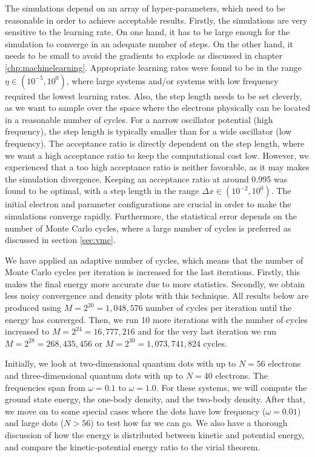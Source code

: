 The simulations depend on an array of hyper-parameters, which need to be reasonable in order to achieve acceptable results. Firstly, the simulations are very sensitive to the learning rate. On one hand, it has to be large enough for the simulation to converge in an adequate number of steps. On the other hand, it needs to be small to avoid the gradients to explode as discussed in chapter \ref{chp:machinelearning}. Appropriate learning rates were found to be in the range $\eta\in(10^{-5}, 10^{0})$, where large systems and/or systems with low frequency required the lowest learning rates. Also, the step length needs to be set cleverly, as we want to sample over the space where the electrons physically can be located in a reasonable number of cycles. For a narrow oscillator potential (high frequency), the step length is typically smaller than for a wide oscillator (low frequency). The acceptance ratio is directly dependent on the step length, where we want a high acceptance ratio to keep the computational cost low. However, we experienced that a too high acceptance ratio is neither favorable, as it may makes the simulation divergence. Keeping an acceptance ratio at around 0.995 was found to be optimal, with a step length in the range $\Delta x\in(10^{-2},10^0)$. The initial electron and parameter configurations are crucial in order to make the simulations converge rapidly. Furthermore, the statistical error depends on the number of Monte Carlo cycles, where a large number of cycles is preferred as discussed in section \ref{sec:vmc}. 

We have applied an adaptive number of cycles, which means that the number of Monte Carlo cycles per iteration is increased for the last iterations. Firstly, this makes the final energy more accurate due to more statistics. Secondly, we obtain less noisy convergence and density plots with this technique. All results below are produced using $M=2^{20}=1,048,576$ number of cycles per iteration until the energy has converged. Then, we run 10 more iterations with the number of cycles increased to $M=2^{24}=16,777,216$ and for the very last iteration we run $M=2^{28}=268,435,456$ or $M=2^{30}=1,073,741,824$ cycles.

Initially, we look at two-dimensional quantum dots with up to $N=56$ electrons and three-dimensional quantum dots with up to $N=40$ electrons. The frequencies span from  $\omega=0.1$ to $\omega=1.0$. For these systems, we will compute the ground state energy, the one-body density, and the two-body density. After that, we move on to some special cases where the dots have low frequency ($\omega=0.01$) and large dots ($N>56$) to test how far we can go. We also have a thorough discussion of how the energy is distributed between kinetic and potential energy, and compare the kinetic-potential energy ratio to the virial theorem.

